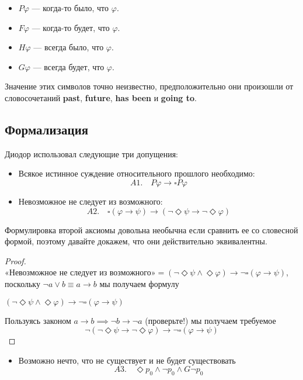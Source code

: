 \documentclass[openany]{book}
\theoremstyle{plain}
\theoremstyle{definition}
\begin{document}
\begin{itemize}
    \item \(P\varphi\) — когда-то было, что \(\varphi\).
    \item \(F\varphi\) — когда-то будет, что \(\varphi\).
    \item \(H\varphi\) — всегда было, что \(\varphi\).
    \item \(G\varphi\) — всегда будет, что \(\varphi\).
\end{itemize}

Значение этих символов точно неизвестно, предположительно они произошли от словосочетаний \textbf{past}, \textbf{future}, \textbf{has been} и \textbf{going to}. 

\subsection{Формализация}

Диодор использовал следующие три допущения:

\begin{itemize}
    \item Всякое истинное суждение относительного прошлого необходимо:
	\[A1. \quad P\varphi \to \square P\varphi \]
    \item Невозможное не следует из возможного:
	\[A2. \quad \square(\varphi \to \psi) \to (\neg \Diamond \psi \to \neg \Diamond \varphi)\]
\end{itemize}

Формулировка второй аксиомы довольна необычна если сравнить ее со словесной формой, поэтому давайте докажем, что они действительно эквивалентны.
\begin{proof}

    \(\text{«Невозможное не следует из возможного»} = (\neg \Diamond \psi \land \Diamond \varphi) \to \neg \square (\varphi \to \psi)\), поскольку \(\neg a \lor b \equiv a \to b\) мы получаем формулу

    \((\neg \Diamond \psi \land \Diamond \varphi) \to \neg \square (\varphi \to \psi)\)

    Пользуясь законом \(a \to b \implies \neg b \to \neg a\) (проверьте!) мы получаем требуемое
    $$\neg(\neg \Diamond \psi \to \neg \Diamond \varphi) \to \neg \square (\varphi \to \psi)$$
\end{proof}
\begin{itemize}
    \item Возможно нечто, что не существует и не будет существовать
	\[A3. \quad \Diamond p_0 \land \neg p_0 \land G\neg p_0\]
\end{itemize}
\end{document}
